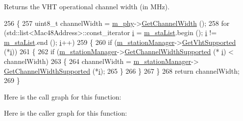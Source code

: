 \begin{DoxyReturn}{Returns}
the V\+HT operational channel width (in M\+Hz). 
\end{DoxyReturn}

\begin{DoxyCode}
256 \{
257   uint8\_t channelWidth = \hyperlink{classns3_1_1RegularWifiMac_a1a6dad8eb0a057a4e1b459f518457a4c}{m\_phy}->\hyperlink{classns3_1_1WifiPhy_a4a5d5009b3b3308f2baeed42a2007189}{GetChannelWidth} ();
258   \textcolor{keywordflow}{for} (std::list<Mac48Address>::const\_iterator \hyperlink{bernuolliDistribution_8m_a6f6ccfcf58b31cb6412107d9d5281426}{i} = \hyperlink{classns3_1_1ApWifiMac_a2a483f2002457f12a9e53e4b227cf1e8}{m\_staList}.begin (); 
      \hyperlink{bernuolliDistribution_8m_a6f6ccfcf58b31cb6412107d9d5281426}{i} != \hyperlink{classns3_1_1ApWifiMac_a2a483f2002457f12a9e53e4b227cf1e8}{m\_staList}.end (); \hyperlink{bernuolliDistribution_8m_a6f6ccfcf58b31cb6412107d9d5281426}{i}++)
259     \{
260       \textcolor{keywordflow}{if} (\hyperlink{classns3_1_1RegularWifiMac_a76d1a5e27b64bfe36f24a55d1eea2775}{m\_stationManager}->\hyperlink{classns3_1_1WifiRemoteStationManager_aecf5ed3203b9b55cd831696a08daa5fe}{GetVhtSupported} (*\hyperlink{bernuolliDistribution_8m_a6f6ccfcf58b31cb6412107d9d5281426}{i}))
261         \{
262           \textcolor{keywordflow}{if} (\hyperlink{classns3_1_1RegularWifiMac_a76d1a5e27b64bfe36f24a55d1eea2775}{m\_stationManager}->\hyperlink{classns3_1_1WifiRemoteStationManager_a8e61df321e8e10b731dea83caafb0cce}{GetChannelWidthSupported} (*
      \hyperlink{bernuolliDistribution_8m_a6f6ccfcf58b31cb6412107d9d5281426}{i}) < channelWidth)
263             \{
264               channelWidth = \hyperlink{classns3_1_1RegularWifiMac_a76d1a5e27b64bfe36f24a55d1eea2775}{m\_stationManager}->
      \hyperlink{classns3_1_1WifiRemoteStationManager_a8e61df321e8e10b731dea83caafb0cce}{GetChannelWidthSupported} (*\hyperlink{bernuolliDistribution_8m_a6f6ccfcf58b31cb6412107d9d5281426}{i});
265             \}
266         \}
267     \}
268   \textcolor{keywordflow}{return} channelWidth;
269 \}
\end{DoxyCode}


Here is the call graph for this function\+:




Here is the caller graph for this function\+:


